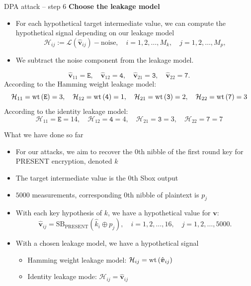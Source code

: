\begin{frame}{DPA attack -- step 6}
    \textbf{Choose the leakage model}
    \begin{itemize}
        \item For each hypothetical target intermediate value, we can compute the hypothetical signal depending on our leakage model
    \[
    \mathcal{H}_{ij}:=\mathcal{L}(\hat{\boldsymbol{v}}_{ij})-\text{noise},\quad i=1,2,\dots,M_k,\quad j=1,2,\dots,M_p,
    \]
    \item We subtract the noise component from the leakage model.
    \end{itemize}
    \begin{example}
    \[
    \hat{\boldsymbol{v}}_{11}=\texttt{E},\quad\hat{\boldsymbol{v}}_{12}=\texttt{4},\quad\hat{\boldsymbol{v}}_{21}=\texttt{3},\quad\hat{\boldsymbol{v}}_{22}=\texttt{7}.
    \]
    According to the Hamming weight leakage model:
    \[
    \mathcal{H}_{11}=\textrm{wt}\left(\texttt{E}\right)=3,\quad\mathcal{H}_{12}=\textrm{wt}\left(\texttt{4}\right)=1,\quad\mathcal{H}_{21}=\textrm{wt}\left(\texttt{3}\right)=2,\quad\mathcal{H}_{22}=\textrm{wt}\left(\texttt{7}\right)=3
    \]
    According to the identity leakage model:
    \[
    \mathcal{H}_{11}=\texttt{E}=14,\quad\mathcal{H}_{12}=\texttt{4}=4,\quad\mathcal{H}_{21}=\texttt{3}=3,\quad\mathcal{H}_{22}=\texttt{7}=7
    \]
    \end{example}
\end{frame}

\begin{frame}{What we have done so far}
    \begin{example}
    \begin{itemize}
        \item For our attacks, we aim to recover the $0$th nibble of the first round key for PRESENT encryption, denoted $k$
        \item The target intermediate value is the $0$th Sbox output
        \item $5000$ measurements, corresponding $0$th nibble of plaintext is $p_j$
        \item With each key hypothesis of $k$, we have a hypothetical value for $\boldsymbol{v}$:
        \[
    \hat{\boldsymbol{v}}_{ij}=\text{SB}_{\text{PRESENT}}(\hat{k}_i\oplus p_j),\quad i=1,2,\dots,16,\quad j=1,2,\dots,5000.
    \]
    \item With a chosen leakage model, we have a hypothetical signal
    \begin{itemize}
        \item Hamming weight leakage model: $\mathcal{H}_{ij}=\textrm{wt}\left(\hat{\boldsymbol{v}}_{ij}\right)$
        \item Identity leakage mode: $\mathcal{H}_{ij}=\hat{\boldsymbol{v}}_{ij}$
    \end{itemize}
    \end{itemize}
    \end{example}
\end{frame}

